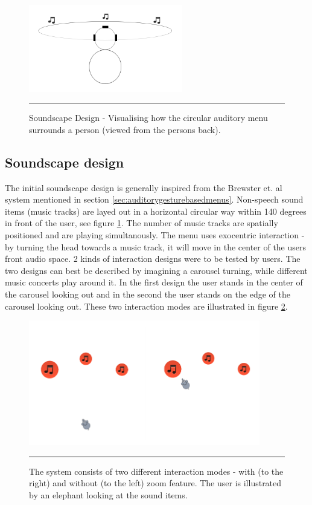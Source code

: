 \begin{figure}[t]
	\centering
		\includegraphics[width=0.6\textwidth,height=\textheight,keepaspectratio]{./Figures/sounddesign.png}
		\rule{35em}{0.5pt}
	\caption[Soundscape Design]{Soundscape Design - Visualising how the circular auditory menu surrounds a person (viewed from the persons back).}
	\label{fig:sounddesign}
\end{figure}

\subsection{Soundscape design}
\label{sec:designsoundscape}
The initial soundscape design is generally inspired from the Brewster et. al system \cite{brewster_multimodal_2003} mentioned in section \ref{sec:auditorygesturebasedmenus}. Non-speech sound items (music tracks) are layed out in a horizontal circular way within 140 degrees in front of the user, see figure \ref{fig:sounddesign}. The number of music tracks are spatially positioned and are playing simultanously. The menu uses exocentric interaction - by turning the head towards a music track, it will move in the center of the users front audio space. 2 kinds of interaction designs were to be tested by users. The two designs can best be described by imagining a carousel turning, while different music concerts play around it. In the first design the user stands in the center of the carousel looking out and in the second the user stands on the edge of the carousel looking out. These two interaction modes are illustrated in figure \ref{fig:interactionmodes}.

\begin{figure}[t]
	\centering
		\includegraphics[width=0.9\textwidth,height=\textheight,keepaspectratio]{./Figures/interactionmodes.png}
		\rule{35em}{0.5pt}
	\caption[Interaction modes]{The system consists of two different interaction modes - with (to the right) and without (to the left) zoom feature. The user is illustrated by an elephant looking at the sound items.}
	\label{fig:interactionmodes}
\end{figure}

